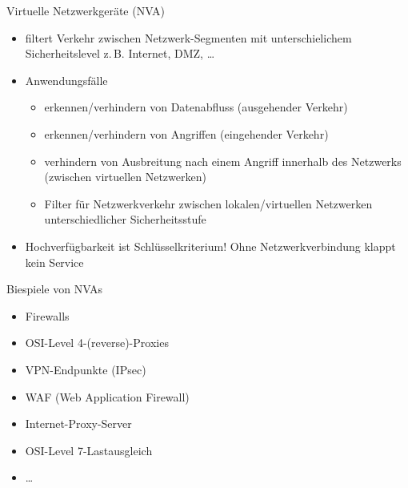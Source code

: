 \begin{flashcard}[]{Virtuelle Netzwerkgeräte (NVA)}
  \begin{itemize}
    \item filtert Verkehr zwischen Netzwerk-Segmenten mit unterschielichem Sicherheitslevel\newline
      z.\,B. Internet, DMZ, \ldots
    \item Anwendungsfälle
      \begin{itemize}
        \item erkennen/verhindern von Datenabfluss (ausgehender Verkehr)
        \item erkennen/verhindern von Angriffen (eingehender Verkehr)
        \item verhindern von Ausbreitung nach einem Angriff innerhalb des Netzwerks (zwischen virtuellen Netzwerken)
        \item Filter für Netzwerkverkehr zwischen lokalen/virtuellen Netzwerken unterschiedlicher Sicherheitsstufe
      \end{itemize}
    \item Hochverfügbarkeit ist Schlüsselkriterium! Ohne Netzwerkverbindung klappt kein Service
  \end{itemize}
\end{flashcard}

\begin{flashcard}[]{Biespiele von NVAs}
  \begin{itemize}
    \item Firewalls
    \item OSI-Level 4-(reverse)-Proxies
    \item VPN-Endpunkte (IPsec)
    \item WAF (Web Application Firewall)
    \item Internet-Proxy-Server
    \item OSI-Level 7-Lastausgleich
    \item \ldots
  \end{itemize}
\end{flashcard}

